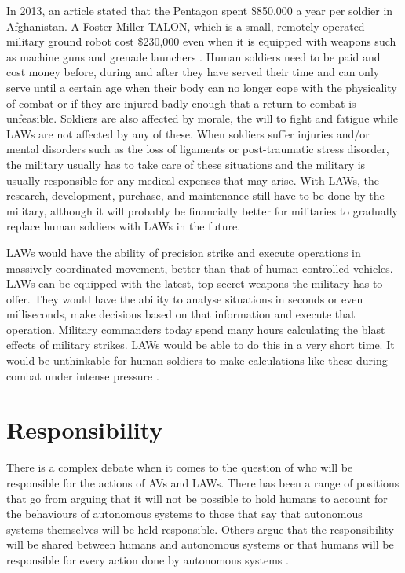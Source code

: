 \documentclass[journal]{IEEEtran}
\begin{document}
In 2013, an article stated that the Pentagon spent \$850,000 a year per soldier in Afghanistan. A Foster-Miller TALON, which is a small, remotely operated military ground robot cost \$230,000 even when it is equipped with weapons such as machine guns and grenade launchers \cite{etzioni2017pros}. Human soldiers need to be paid and cost money before, during and after they have served their time and can only serve until a certain age when their body can no longer cope with the physicality of combat or if they are injured badly enough that a return to combat is unfeasible. Soldiers are also affected by morale, the will to fight and fatigue while LAWs are not affected by any of these. When soldiers suffer injuries and/or mental disorders such as the loss of ligaments or post-traumatic stress disorder, the military usually has to take care of these situations and the military is usually responsible for any medical expenses that may arise. With LAWs, the research, development, purchase, and maintenance still have to be done by the military, although it will probably be financially better for militaries to gradually replace human soldiers with LAWs in the future.

LAWs would have the ability of precision strike and execute operations in massively coordinated movement, better than that of human-controlled vehicles. LAWs can be equipped with the latest, top-secret weapons the military has to offer. They would have the ability to analyse situations in seconds or even milliseconds, make decisions based on that information and execute that operation. Military commanders today spend many hours calculating the blast effects of military strikes. LAWs would be able to do this in a very short time. It would be unthinkable for human soldiers to make calculations like these during combat under intense pressure \cite{guetlein2005lethal}.

\section{Responsibility}
There is a complex debate when it comes to the question of who will be responsible for the actions of AVs and LAWs. There has been a range of positions that go from arguing that it will not be possible to hold humans to account for the behaviours of autonomous systems to those that say that autonomous systems themselves will be held responsible. Others argue that the responsibility will be shared between humans and autonomous systems or that humans will be responsible for every action done by autonomous systems \cite{noorman2014negotiating}.
\end{document}
